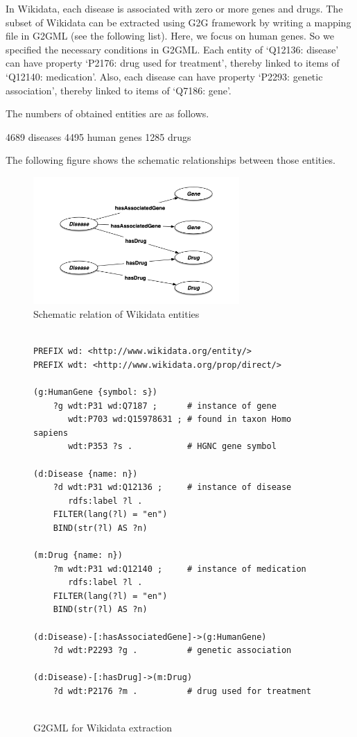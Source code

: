 \documentclass[runningheads]{llncs}
\begin{document}
In Wikidata, each disease is associated with zero or more genes and drugs.
The subset of Wikidata can be extracted using G2G framework by writing a mapping file in G2GML (see the following list).
Here, we focus on human genes. So we specified the necessary conditions in G2GML.
Each entity of ‘Q12136: disease’ can have property ‘P2176: drug used for treatment’, thereby linked to items of ‘Q12140: medication’. Also, each disease can have property ‘P2293: genetic association’, thereby linked to items of ‘Q7186: gene’.
 
The numbers of obtained entities are as follows.
 
4689 diseases
4495 human genes
1285 drugs
 
The following figure shows the schematic relationships between those entities.
 
\begin{figure}
\center
\includegraphics[width=0.7\textwidth]{wikidata_schema.png}
\caption{Schematic relation of Wikidata entities}
\label{fig:wikidata_schema.png}
\end{figure}
 
\begin{figure}[!t]
\vspace{2mm}
\begin{scriptsize}
\begin{verbatim}
 
PREFIX wd: <http://www.wikidata.org/entity/>
PREFIX wdt: <http://www.wikidata.org/prop/direct/>
 
(g:HumanGene {symbol: s})
    ?g wdt:P31 wd:Q7187 ;      # instance of gene
       wdt:P703 wd:Q15978631 ; # found in taxon Homo sapiens
       wdt:P353 ?s .           # HGNC gene symbol
 
(d:Disease {name: n})
    ?d wdt:P31 wd:Q12136 ;     # instance of disease
       rdfs:label ?l .
    FILTER(lang(?l) = "en")
    BIND(str(?l) AS ?n)
 
(m:Drug {name: n})
    ?m wdt:P31 wd:Q12140 ;     # instance of medication
       rdfs:label ?l .
    FILTER(lang(?l) = "en")
    BIND(str(?l) AS ?n)
 
(d:Disease)-[:hasAssociatedGene]->(g:HumanGene)
    ?d wdt:P2293 ?g .          # genetic association
 
(d:Disease)-[:hasDrug]->(m:Drug)
    ?d wdt:P2176 ?m .          # drug used for treatment
 
\end{verbatim}
\end{scriptsize}
\caption{G2GML for Wikidata extraction}
\label{fig:g2gml_wikidata}
\end{figure}
 
\end{document}
